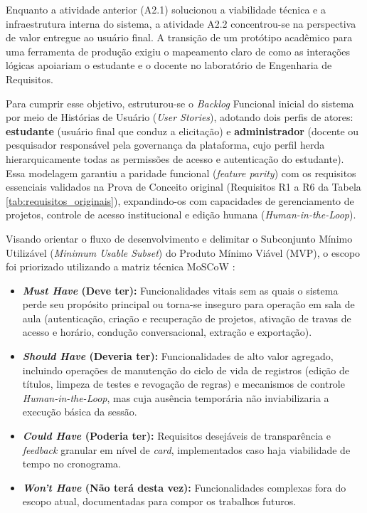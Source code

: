 Enquanto a atividade anterior (A2.1) solucionou a viabilidade técnica e a infraestrutura interna do sistema, a atividade A2.2 concentrou-se na perspectiva de valor entregue ao usuário final. A transição de um protótipo acadêmico para uma ferramenta de produção exigiu o mapeamento claro de como as interações lógicas apoiariam o estudante e o docente no laboratório de Engenharia de Requisitos.

Para cumprir esse objetivo, estruturou-se o \textit{Backlog} Funcional inicial do sistema por meio de Histórias de Usuário (\textit{User Stories}), adotando dois perfis de atores: \textbf{estudante} (usuário final que conduz a elicitação) e \textbf{administrador} (docente ou pesquisador responsável pela governança da plataforma, cujo perfil herda hierarquicamente todas as permissões de acesso e autenticação do estudante). Essa modelagem garantiu a paridade funcional (\textit{feature parity}) com os requisitos essenciais validados na Prova de Conceito original (Requisitos R1 a R6 da Tabela \ref{tab:requisitos_originais}), expandindo-os com capacidades de gerenciamento de projetos, controle de acesso institucional e edição humana (\textit{Human-in-the-Loop}).

Visando orientar o fluxo de desenvolvimento e delimitar o Subconjunto Mínimo Utilizável (\textit{Minimum Usable Subset}) do Produto Mínimo Viável (MVP), o escopo foi priorizado utilizando a matriz técnica MoSCoW \cite{agilebusiness2014}:

\begin{itemize}
    \item \textbf{\textit{Must Have} (Deve ter):} Funcionalidades vitais sem as quais o sistema perde seu propósito principal ou torna-se inseguro para operação em sala de aula (autenticação, criação e recuperação de projetos, ativação de travas de acesso e horário, condução conversacional, extração e exportação).
    \item \textbf{\textit{Should Have} (Deveria ter):} Funcionalidades de alto valor agregado, incluindo operações de manutenção do ciclo de vida de registros (edição de títulos, limpeza de testes e revogação de regras) e mecanismos de controle \textit{Human-in-the-Loop}, mas cuja ausência temporária não inviabilizaria a execução básica da sessão.
    \item \textbf{\textit{Could Have} (Poderia ter):} Requisitos desejáveis de transparência e \textit{feedback} granular em nível de \textit{card}, implementados caso haja viabilidade de tempo no cronograma.
    \item \textbf{\textit{Won't Have} (Não terá desta vez):} Funcionalidades complexas fora do escopo atual, documentadas para compor os trabalhos futuros.
\end{itemize}

